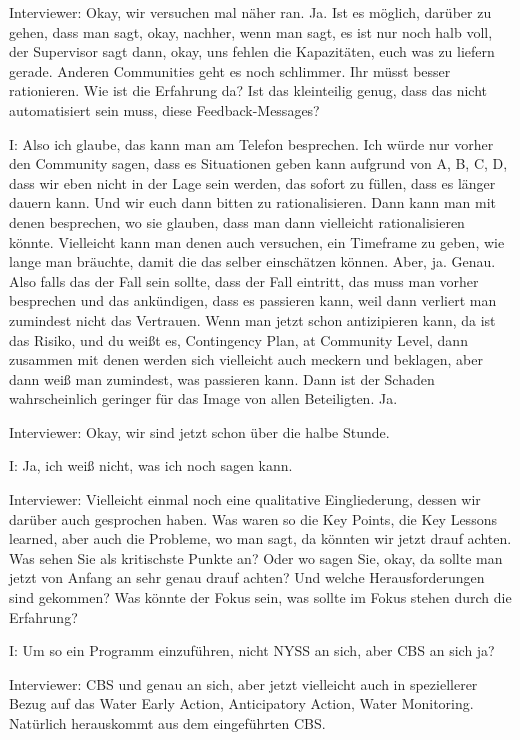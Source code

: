 Interviewer: Okay, wir versuchen mal näher ran. Ja. Ist es möglich, darüber zu gehen, dass man sagt, okay, nachher, wenn man sagt, es ist nur noch halb voll, der Supervisor sagt dann, okay, uns fehlen die Kapazitäten, euch was zu liefern gerade. Anderen Communities geht es noch schlimmer. Ihr müsst besser rationieren. Wie ist die Erfahrung da? Ist das kleinteilig genug, dass das nicht automatisiert sein muss, diese Feedback-Messages?

I: Also ich glaube, das kann man am Telefon besprechen. Ich würde nur vorher den Community sagen, dass es Situationen geben kann aufgrund von A, B, C, D, dass wir eben nicht in der Lage sein werden, das sofort zu füllen, dass es länger dauern kann. Und wir euch dann bitten zu rationalisieren. Dann kann man mit denen besprechen, wo sie glauben, dass man dann vielleicht rationalisieren könnte. Vielleicht kann man denen auch versuchen, ein Timeframe zu geben, wie lange man bräuchte, damit die das selber einschätzen können. Aber, ja. Genau. Also falls das der Fall sein sollte, dass der Fall eintritt, das muss man vorher besprechen und das ankündigen, dass es passieren kann, weil dann verliert man zumindest nicht das Vertrauen. Wenn man jetzt schon antizipieren kann, da ist das Risiko, und du weißt es, Contingency Plan, at Community Level, dann zusammen mit denen werden sich vielleicht auch meckern und beklagen, aber dann weiß man zumindest, was passieren kann. Dann ist der Schaden wahrscheinlich geringer für das Image von allen Beteiligten. Ja. 

Interviewer: Okay, wir sind jetzt schon über die halbe Stunde. 

I: Ja, ich weiß nicht, was ich noch sagen kann.

Interviewer: Vielleicht einmal noch eine qualitative Eingliederung, dessen wir darüber auch gesprochen haben. Was waren so die Key Points, die Key Lessons learned, aber auch die Probleme, wo man sagt, da könnten wir jetzt drauf achten. Was sehen Sie als kritischste Punkte an? Oder wo sagen Sie, okay, da sollte man jetzt von Anfang an sehr genau drauf achten? Und welche Herausforderungen sind gekommen? Was könnte der Fokus sein, was sollte im Fokus stehen durch die Erfahrung?

I:  Um so ein Programm einzuführen, nicht NYSS an sich, aber CBS an sich ja?

Interviewer: CBS und genau an sich, aber jetzt vielleicht auch in speziellerer Bezug auf das Water Early Action, Anticipatory Action, Water Monitoring. Natürlich herauskommt aus dem eingeführten CBS. 

